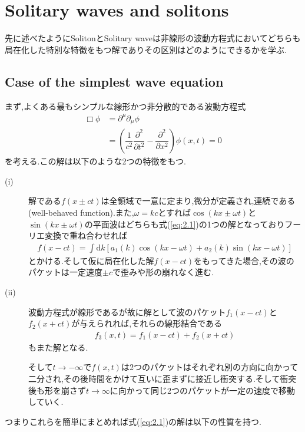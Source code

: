 \documentclass[dvipdfmx,11pt,a4paper]{jsbook}
\begin{document}
\section{Solitary waves and solitons}
先に述べたようにSolitonとSolitary waveは非線形の波動方程式においてどちらも局在化した特別な特徴をもつ解でありその区別はどのようにできるかを学ぶ.

\subsection{Case of the simplest wave equation}
まず,よくある最もシンプルな線形かつ非分散的である波動方程式
\begin{align}
    \Box\phi & =\partial^{\mu}\partial_{\mu}\phi\nonumber                                                                             \\
             & =\left(\dfrac{1}{c^2}\dfrac{\partial^2}{\partial t^2}-\dfrac{\partial^2}{\partial x^2}\right)\phi(x,t)=0\label{eq:2.1}
\end{align}
を考える.この解は以下のような2つの特徴をもつ.
\begin{description}
    \item[(i)] 解である$f(x\pm ct)$は全領域で一意に定まり,微分が定義され,連続である(well-behaved function).また,$\omega=kc$とすれば$\cos(kx\pm \omega t)$と$\sin(kx\pm \omega t)$の平面波はどちらも式(\ref{eq:2.1})の1つの解となっておりフーリエ変換で重ね合わせれば
          \begin{align}
              f(x-c t)=\int \mathrm{d} k\left[a_{1}(k) \cos (k x-\omega t)+a_{2}(k) \sin (k x-\omega t)\right]
          \end{align}
          とかける.そして仮に局在化した解$f(x-ct)$をもってきた場合,その波のパケットは一定速度$\pm c$で歪みや形の崩れなく進む.
    \item[(ii)] 波動方程式が線形であるが故に解として波のパケット$f_1(x-ct)$と$f_2(x+ct)$が与えられれば,それらの線形結合である
          \begin{align*}
              f_3(x,t)=f_1(x-ct)+f_2(x+ct)
          \end{align*}
          もまた解となる.

          そして$t\rightarrow-\infty$で$f(x,t)$は2つのパケットはそれぞれ別の方向に向かって二分され,その後時間をかけて互いに歪まずに接近し衝突する.そして衝突後も形を崩さず$t\rightarrow\infty$に向かって同じ2つのパケットが一定の速度で移動していく.
\end{description}
つまりこれらを簡単にまとめれば式(\ref{eq:2.1})の解は以下の性質を持つ.
\end{document}
